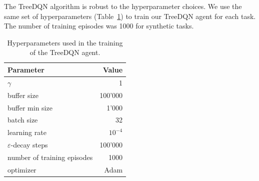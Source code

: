 \documentclass[preprint,12pt]{elsarticle} %
\theoremstyle{plain}
\theoremstyle{definition}
\theoremstyle{remark}
\begin{document}
The TreeDQN algorithm is robust to the hyperparameter choices. We use the same set of hyperparameters (Table~\ref{tab:params}) to train our TreeDQN agent for each task. The number of training episodes was 1000 for synthetic tasks. %

\begin{table}[t]
\caption{Hyperparameters used in the training of the TreeDQN agent.}\label{tab:params}
\footnotesize
\begin{center}
    \begin{tabular}{lr}
    \hline
    Parameter & Value \\
    \hline
    $\gamma$ & 1 \\
    buffer size & 100'000 \\
    buffer min size & 1'000 \\
    batch size & 32 \\
    learning rate & $10^{-4}$ \\
    $\varepsilon$-decay steps & 100'000 \\
    number of training episodes & 1000 \\
    optimizer & Adam\\
    \hline
    \end{tabular}

\end{center}
\end{table}

\begin{table}[t]
\caption{Parameters used to generate train, validation, test, and transfer tasks. Combinatorial Auction (items/bids), Set Cover(rows/cols), Maximum Independent Set(nodes), Facility Location (clusters/facilities), Multiple Knapsack (items/knapsacks). }\label{tab:taskparams}
\begin{center}
\end{center}
\end{table}
\end{document}

